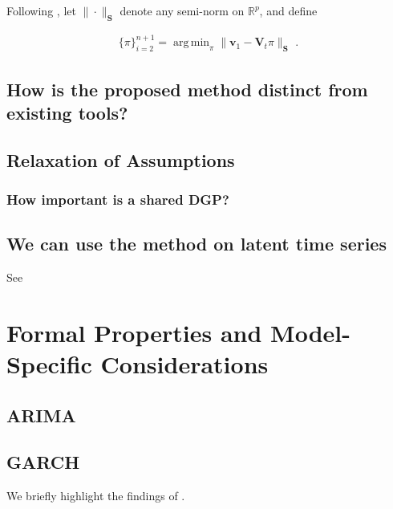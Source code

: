 \documentclass[11pt]{article}
\newcommand{\V}{\textbf{V}}
\DeclareMathOperator*{\argmin}{arg\,min} %
\theoremstyle{definition}
\begin{document}
    Following \citet{abadie2003economic,abadie2010synthetic}, let $\|\cdot\|_{\textbf{S}}$ denote any semi-norm on $\mathbb{R}^{p}$, and define

    \begin{align*}
    \{\pi\}_{i=2}^{n+1} = \argmin_{\pi}\|\textbf{v}_{1} - \V_{t}\pi \|_{\textbf{S}} \text{ .}
    \end{align*}
    
\subsection{How is the proposed method distinct from existing tools?}

\subsection{Relaxation of Assumptions}
\subsubsection{How important is a shared DGP?}

\subsection{We can use the method on latent time series}
See \cite{lundquist2024volatility}

\section{Formal Properties and Model-Specific Considerations}\label{special_cases}

 


\subsection{ARIMA}
\cite{lin2021minimizing}
\subsection{GARCH}
We briefly highlight the findings of \citep{lundquist2024volatility}.
\end{document}
